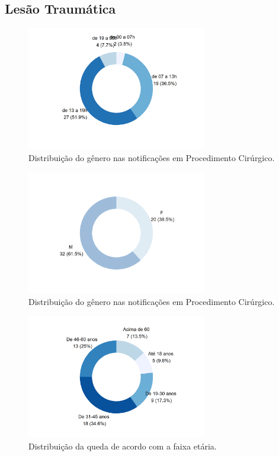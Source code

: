 \documentclass[
  a4paper]{article}
\begin{document}
\subsection{Lesão Traumática}

\begin{figure}[H]
\caption{Distribuição do gênero nas notificações em Procedimento Cirúrgico.}
\includegraphics[width=0.7\textwidth]{Imagens/trauma_periodo.png}
\end{figure}

\begin{figure}[H]
\caption{Distribuição do gênero nas notificações em Procedimento Cirúrgico.}
\includegraphics[width=0.7\textwidth]{Imagens/trauma_SEXO.png}
\end{figure}

\begin{figure}[H]
\caption{Distribuição da queda de acordo com a faixa etária.}
\includegraphics[width=0.7\textwidth]{Imagens/trauma_faixa_etaria.png}
\end{figure}
\end{document}
